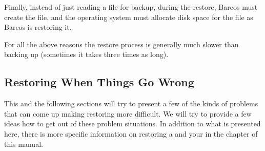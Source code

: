 Finally, instead of just reading a file for backup, during the restore, Bareos
must create the file, and the operating system must allocate disk space for
the file as Bareos is restoring it.

For all the above reasons the restore process is generally much slower than
backing up (sometimes it takes three times as long).


\subsection{Restoring When Things Go Wrong}
\label{sec:RestoreCatalog}


This and the following sections will try to present a few of the kinds of
problems that can come up making restoring more difficult. We will try to
provide a few ideas how to get out of these problem situations.
In addition to what is presented here, there is more specific information
on restoring a  and your
 in the  chapter of this manual.

